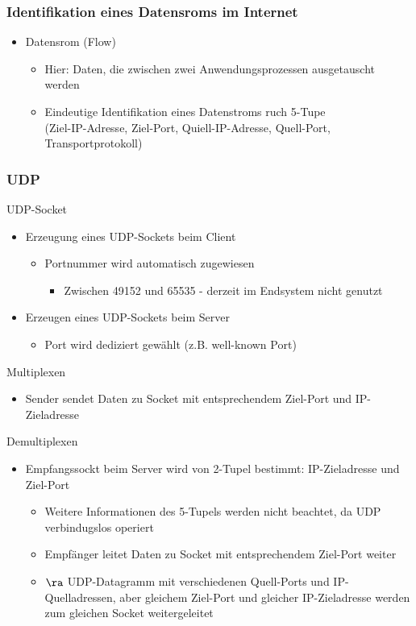     \subsubsection{Identifikation eines Datensroms im Internet}
      \begin{itemize}
        \item Datensrom (Flow)
          \begin{itemize}
            \item Hier: Daten, die zwischen zwei Anwendungsprozessen ausgetauscht werden
            \item Eindeutige Identifikation eines Datenstroms ruch 5-Tupe\\
              (Ziel-IP-Adresse, Ziel-Port, Quiell-IP-Adresse, Quell-Port, Transportprotokoll)
          \end{itemize}
      \end{itemize}
    \subsubsection{UDP}
      UDP-Socket
      \begin{itemize}
        \item Erzeugung eines UDP-Sockets beim Client
        \begin{itemize}
          \item Portnummer wird automatisch zugewiesen
            \begin{itemize}
              \item Zwischen 49152 und 65535 - derzeit im Endsystem nicht genutzt
            \end{itemize}
        \end{itemize}
      \item Erzeugen eines UDP-Sockets beim Server
        \begin{itemize}
          \item Port wird dediziert gewählt (z.B. well-known Port)
        \end{itemize}
      \end{itemize}
      Multiplexen
      \begin{itemize}
        \item Sender sendet Daten zu Socket mit entsprechendem Ziel-Port und IP-Zieladresse
      \end{itemize}
      Demultiplexen
      \begin{itemize}
        \item Empfangssockt beim Server wird von 2-Tupel bestimmt: IP-Zieladresse und Ziel-Port
          \begin{itemize}
            \item Weitere Informationen des 5-Tupels werden nicht beachtet, da UDP verbindugslos
              operiert
            \item Empfänger leitet Daten zu Socket mit entsprechendem Ziel-Port weiter
            \item $\ra$ UDP-Datagramm mit verschiedenen Quell-Ports und IP-Quelladressen, aber
              gleichem Ziel-Port und gleicher IP-Zieladresse werden zum gleichen Socket weitergeleitet
          \end{itemize}
      \end{itemize}
